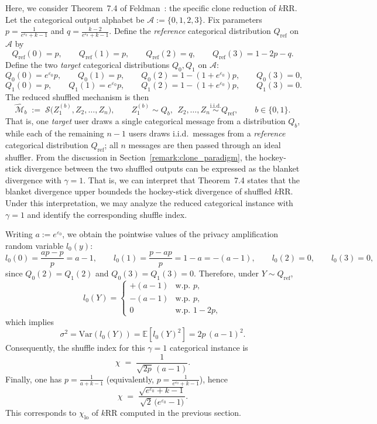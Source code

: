 \documentclass{article}
\theoremstyle{plain}
\theoremstyle{definition}
\begin{document}
Here, we consider Theorem~7.4 of Feldman~\cite{feldmanStrongerPrivacyAmplification2023a}: the specific clone reduction of $k$RR.
Let the categorical output alphabet be $\mathcal A:=\{0,1,2,3\}$.
Fix parameters $p=\frac{1}{e^{\varepsilon_0}+k-1}$ and $q=\frac{k-2}{e^{\varepsilon_0}+k-1}$.
Define the \emph{reference} categorical distribution $Q_{\mathrm{ref}}$ on $\mathcal A$ by
\[
Q_{\mathrm{ref}}(0)=p,\qquad
Q_{\mathrm{ref}}(1)=p,\qquad
Q_{\mathrm{ref}}(2)=q,\qquad
Q_{\mathrm{ref}}(3)=1-2p-q.
\]
Define the two \emph{target} categorical distributions $Q_0,Q_1$ on $\mathcal A$:
\[
Q_{0}(0)=e^{\varepsilon_0}p,\qquad
Q_{0}(1)=p,\qquad
Q_{0}(2)=1-(1+e^{\varepsilon_0})p,\qquad
Q_0(3)=0,
\]
\[
Q_{1}(0)=p,\qquad
Q_{1}(1)=e^{\varepsilon_0}p,\qquad
Q_{1}(2)=1-(1+e^{\varepsilon_0})p,\qquad
Q_1(3)=0.
\]
The reduced shuffled mechanism is then
\[
\widehat{\mathcal M}_b
\;:=\;
\mathcal S\bigl(Z_1^{(b)},Z_2,\dots,Z_n\bigr),
\qquad
Z_1^{(b)}\sim Q_b,\ \ Z_2,\dots,Z_n\stackrel{\mathrm{i.i.d.}}{\sim}Q_{\mathrm{ref}},
\qquad b\in\{0,1\}.
\]
That is, one \emph{target} user draws a single categorical message from a distribution $Q_b$,
while each of the remaining $n-1$ users draws i.i.d.\ messages from a \emph{reference} categorical
distribution $Q_{\mathrm{ref}}$; all $n$ messages are then passed through an ideal shuffler.
From the discussion in Section~\ref{remark:clone_paradigm}, the hockey-stick divergence between the two shuffled outputs can be expressed as the blanket divergence with $\gamma=1$.
That is, we can interpret that Theorem~7.4 states that the blanket divergence upper boundeds the hockey-stick divergence of shuffled $k$RR.
Under this interpretation, we may analyze the reduced categorical instance with $\gamma=1$ and identify the corresponding shuffle index.


Writing $a:=e^{\varepsilon_0}$, we obtain the pointwise values of the privacy amplification random variable $l_0(y)$:
\[
l_{0}(0)=\frac{ap-p}{p}=a-1,\qquad
l_{0}(1)=\frac{p-ap}{p}=1-a=-(a-1),\qquad
l_{0}(2)=0,\qquad
l_{0}(3)=0,
\]
since $Q_0(2)=Q_1(2)$ and $Q_0(3)=Q_1(3)=0$.
Therefore, under $Y\sim Q_{\mathrm{ref}}$,
\[
l_0(Y)=
\begin{cases}
+(a-1) & \text{w.p. }p,\\
-(a-1) & \text{w.p. }p,\\
0 & \text{w.p. }1-2p,
\end{cases}
\]
which implies
\[
\sigma^2=\mathrm{Var}(l_0(Y))=\mathbb E[l_0(Y)^2]=2p\,(a-1)^2.
\]
Consequently, the shuffle index for this $\gamma=1$ categorical instance is
\[
\chi \;=\; \frac{1}{\sqrt{2p}\,(a-1)}.
\]
Finally, one has $p=\frac{1}{a+k-1}$ (equivalently, $p=\frac{1}{e^{\varepsilon_0}+k-1}$), hence
\[
\chi \;=\;
\frac{\sqrt{e^{\varepsilon_0}+k-1}}{\sqrt{2}\,\bigl(e^{\varepsilon_0}-1\bigr)}.
\]
This corresponds to $\chi_\mathrm{lo}$ of $k$RR computed in the previous section.
\end{document}
